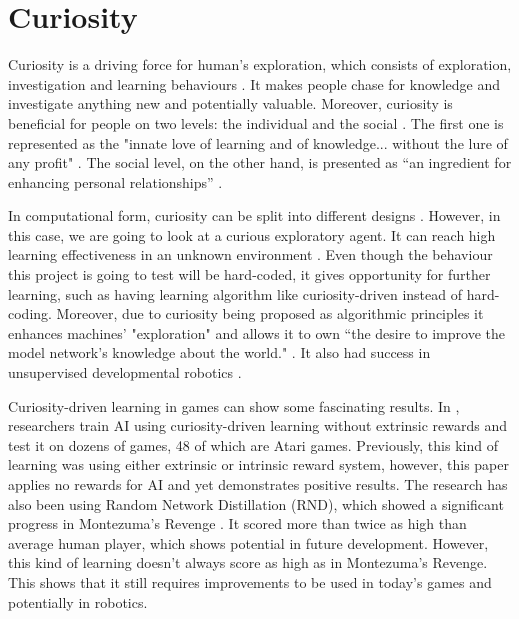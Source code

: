 \documentclass[journal]{IEEEtran}
\begin{document}
\section{Curiosity}
Curiosity is a driving force for human's exploration, which consists of exploration, investigation and learning behaviours \cite{wu2013curiosity}\cite{kashdan2004curiosity}. It makes people chase for knowledge and investigate anything new and potentially valuable. Moreover, curiosity is beneficial for people on two levels: the individual and the social \cite{kashdan2010curiosity}. The first one is represented as the "innate love of learning and of knowledge... without the lure of any profit" \cite{loewenstein1994psychology}. The social level, on the other hand, is presented as ``an ingredient for enhancing personal relationships'' \cite{wu2013curiosity}.

In computational form, curiosity can be split into different designs \cite{wu2013curiosity}. However, in this case, we are going to look at a curious exploratory agent. It can reach high learning effectiveness in an unknown environment \cite{wu2013curiosity}\cite{macedo2005role}. Even though the behaviour this project is going to test will be hard-coded, it gives opportunity for further learning, such as having learning algorithm like curiosity-driven instead of hard-coding. Moreover, due to curiosity being proposed as algorithmic principles \cite{wu2013curiosity}\cite{pang2009curiosity}\cite{karaoguz2011curiosity} it enhances machines' "exploration" and allows it to own ``the desire to improve the model network's knowledge about the world." \cite{schmidhuber1991possibility}. It also had success in unsupervised developmental robotics \cite{schmidhuber2006developmental}\cite{oudeyer2004intelligent}.

Curiosity-driven learning in games can show some fascinating results. In \cite{burda2018large}, researchers train AI using curiosity-driven learning without extrinsic rewards and test it on dozens of games, 48 of which are Atari games. Previously, this kind of learning was using either extrinsic or intrinsic reward system, however, this paper applies no rewards for AI and yet demonstrates positive results. The research has also been using Random Network Distillation (RND), which showed a significant progress in Montezuma's Revenge \cite{openairl}\cite{montezumarevenge}. It scored more than twice as high than average human player, which shows potential in future development. However, this kind of learning doesn't always score as high as in Montezuma's Revenge. This shows that it still requires improvements to be used in today's games and potentially in robotics.
\end{document}
